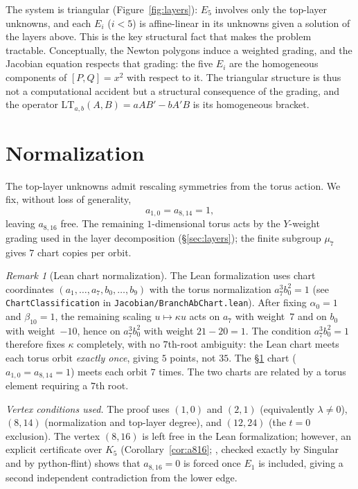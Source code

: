 \documentclass[a4paper,11pt]{article}
\newcommand{\filename}[1]{\texttt{\seqsplit{#1}}}
\theoremstyle{plain}
\theoremstyle{definition}
\theoremstyle{remark}
\newtheorem{remark}[theorem]{Remark}
\begin{document}
The system is triangular (Figure~\ref{fig:layers}): $E_5$ involves only the top-layer unknowns, and each $E_i$ ($i<5$) is affine-linear in its unknowns given a solution of the layers above. This is the key structural fact that makes the problem tractable. Conceptually, the Newton polygons induce a weighted grading, and the Jacobian equation respects that grading: the five $E_i$ are the homogeneous components of $[P,Q]=x^2$ with respect to it. The triangular structure is thus not a computational accident but a structural consequence of the grading, and the operator $\mathrm{LT}_{a,b}(A,B)=aAB'-bA'B$ is its homogeneous bracket.

\section{Normalization}\label{sec:normalization}

The top-layer unknowns admit rescaling symmetries from the torus action. We fix, without loss of generality,
\begin{equation}\label{eq:normalization}
a_{1,0}=a_{8,14}=1,
\end{equation}
leaving $a_{8,16}$ free. The remaining $1$-dimensional torus acts by the $Y$-weight grading used in the layer decomposition (\S\ref{sec:layers}); the finite subgroup $\mu_7$ gives $7$ chart copies per orbit.

\begin{remark}[Lean chart normalization]
The Lean formalization uses chart coordinates $(a_1,\dots,a_7,b_0,\dots,b_9)$ with the torus normalization $a_7^3 b_0^2 = 1$ (see \texttt{ChartClassification} in \texttt{Jacobian/BranchAbChart.lean}). After fixing $\alpha_0 = 1$ and $\beta_{10} = 1$, the remaining scaling $u \mapsto \kappa u$ acts on $a_7$ with weight~$7$ and on $b_0$ with weight~$-10$, hence on $a_7^3 b_0^2$ with weight $21 - 20 = 1$. The condition $a_7^3 b_0^2 = 1$ therefore fixes $\kappa$ completely, with no $7$th-root ambiguity: the Lean chart meets each torus orbit \emph{exactly once}, giving $5$ points, not $35$. The \S\ref{sec:normalization} chart ($a_{1,0} = a_{8,14} = 1$) meets each orbit $7$ times. The two charts are related by a torus element requiring a $7$th root.
\end{remark}

\emph{Vertex conditions used.}\label{sec:lower-edge} The proof uses $(1,0)$ and $(2,1)$ (equivalently $\lambda\neq0$), $(8,14)$ (normalization and top-layer degree), and $(12,24)$ (the $t=0$ exclusion). The vertex $(8,16)$ is left free in the Lean formalization; however, an explicit certificate over $K_5$ (Corollary~\ref{cor:a816}; \filename{scripts/a816\_certificate/}, checked exactly by {\sc Singular} and by python-flint) shows that $a_{8,16} = 0$ is forced once $E_1$ is included, giving a second independent contradiction from the lower edge.
\end{document}
